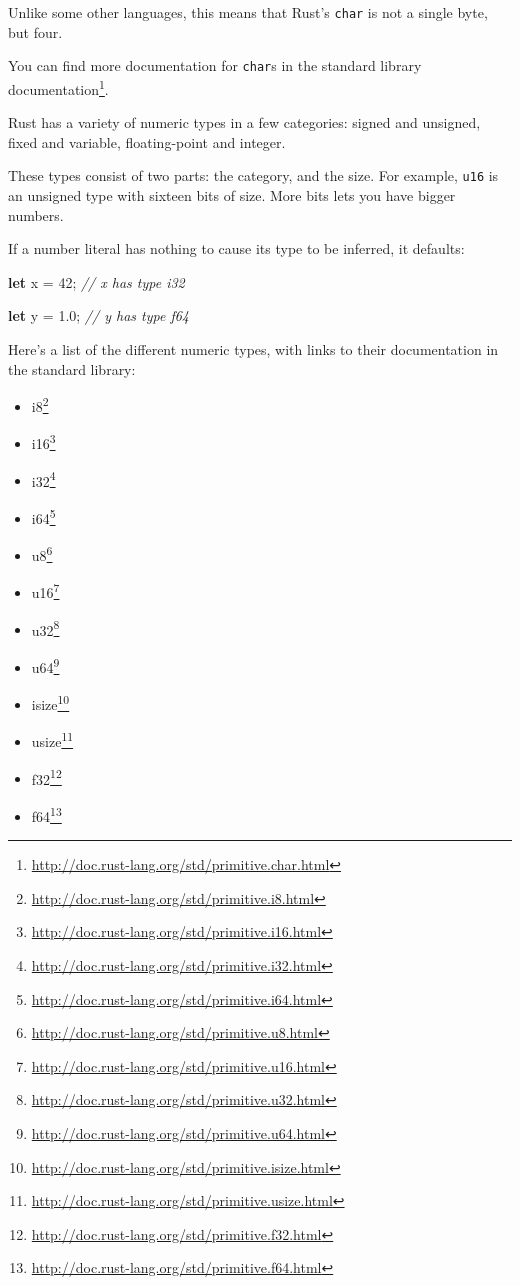\documentclass[a4paper,]{book}
\newenvironment{Shaded}{\begin{snugshade}}{\end{snugshade}}
\newcommand{\KeywordTok}[1]{\textcolor[rgb]{0.13,0.29,0.53}{\textbf{{#1}}}}
\newcommand{\DecValTok}[1]{\textcolor[rgb]{0.00,0.00,0.81}{{#1}}}
\newcommand{\CommentTok}[1]{\textcolor[rgb]{0.56,0.35,0.01}{\textit{{#1}}}}
\newcommand{\NormalTok}[1]{{#1}}
\renewcommand{\href}[2]{#2\footnote{\url{#1}}}
\providecommand{\tightlist}{%
  \setlength{\itemsep}{0pt}\setlength{\parskip}{0pt}}
\begin{document}
Unlike some other languages, this means that Rust's \texttt{char} is not
a single byte, but four.

You can find more documentation for \texttt{char}s
\href{http://doc.rust-lang.org/std/primitive.char.html}{in the standard
library documentation}.


Rust has a variety of numeric types in a few categories: signed and
unsigned, fixed and variable, floating-point and integer.

These types consist of two parts: the category, and the size. For
example, \texttt{u16} is an unsigned type with sixteen bits of size.
More bits lets you have bigger numbers.

If a number literal has nothing to cause its type to be inferred, it
defaults:

\begin{Shaded}
\begin{Highlighting}[]
\KeywordTok{let} \NormalTok{x = }\DecValTok{42}\NormalTok{; }\CommentTok{// x has type i32}

\KeywordTok{let} \NormalTok{y = }\DecValTok{1.0}\NormalTok{; }\CommentTok{// y has type f64}
\end{Highlighting}
\end{Shaded}

Here's a list of the different numeric types, with links to their
documentation in the standard library:

\begin{itemize}
\tightlist
\item
  \href{http://doc.rust-lang.org/std/primitive.i8.html}{i8}
\item
  \href{http://doc.rust-lang.org/std/primitive.i16.html}{i16}
\item
  \href{http://doc.rust-lang.org/std/primitive.i32.html}{i32}
\item
  \href{http://doc.rust-lang.org/std/primitive.i64.html}{i64}
\item
  \href{http://doc.rust-lang.org/std/primitive.u8.html}{u8}
\item
  \href{http://doc.rust-lang.org/std/primitive.u16.html}{u16}
\item
  \href{http://doc.rust-lang.org/std/primitive.u32.html}{u32}
\item
  \href{http://doc.rust-lang.org/std/primitive.u64.html}{u64}
\item
  \href{http://doc.rust-lang.org/std/primitive.isize.html}{isize}
\item
  \href{http://doc.rust-lang.org/std/primitive.usize.html}{usize}
\item
  \href{http://doc.rust-lang.org/std/primitive.f32.html}{f32}
\item
  \href{http://doc.rust-lang.org/std/primitive.f64.html}{f64}
\end{itemize}
\end{document}
